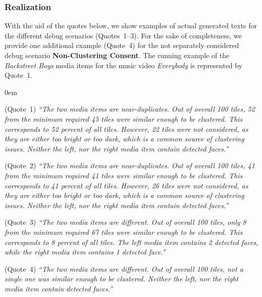 \documentclass{article}
\begin{document}
\subsubsection{Realization}

With the aid of the quotes below,
we show examples of actual generated texts
for the different debug scenarios (Quotes~1--3). 
For the sake of completeness, we provide one additional example (Quote~4)
for the not separately considered debug scenario \textbf{Non-Clustering Consent}.
The running example of the \emph{Backstreet Boys} media items
for the music video \emph{Everybody} 
is represented by Quote~1.

\begin{description}
  \itemsep0em 
  \item[Clustering Consent]
      (Quote~1) \textit{``The two media items are near-duplicates.
      Out of overall 100 tiles, 52 from the minimum required 45 tiles
      were similar enough to be clustered.
      This corresponds to 52 percent of all tiles.
      However, 22 tiles were not considered,
      as they are either too bright or too dark,
      which is a common source of clustering issues.
      Neither the left, nor the right media item contain detected faces.''}    
  \item[Clustering Dissent]    
      (Quote~2) \textit{``The two media items are near-duplicates.
      Out of overall 100 tiles, 41 from the minimum required 41 tiles were similar
      enough to be clustered.
      This corresponds to 41 percent of all tiles.
      However, 26 tiles were not considered, as they are either too bright
      or too dark, which is a common source of clustering issues.
      Neither the left, nor the right media item contain detected faces.''}    
  \item[Non-Clustering Dissent]    
      (Quote~3) \textit{``The two media items are different.
      Out of overall 100 tiles, only 8 from the minimum required 67 tiles
      were similar enough to be clustered.
      This corresponds to 8 percent of all tiles.
      The left media item contains 2 detected faces,
      while the right media item contains 1 detected face.''}
  \item[(Non-Clustering Consent)]    
      (Quote~4) \textit{``The two media items are different.
      Out of overall 100 tiles, not a single one was similar enough
      to be clustered.
      Neither the left, nor the right media item contain detected faces.''}
\end{description}
\end{document}
